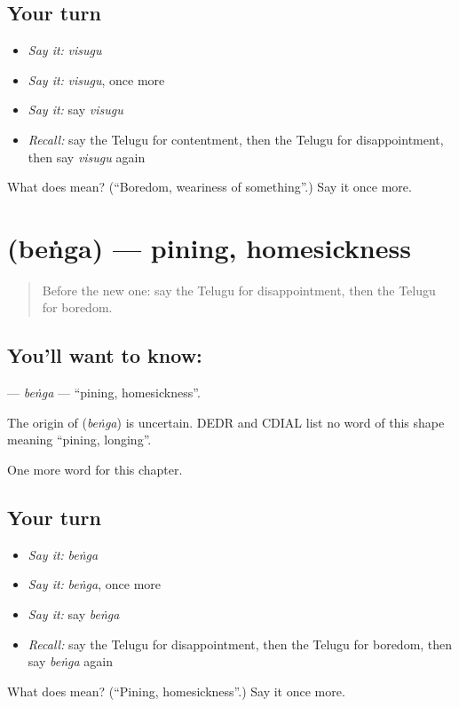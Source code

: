 \subsection*{Your turn}
\begin{itemize}
\raggedright
  \item \emph{Say it:} \emph{visugu}
  \item \emph{Say it:} \emph{visugu}, once more
  \item \emph{Say it:} say \emph{visugu}
  \item \emph{Recall:} say the Telugu for contentment, then the Telugu for disappointment, then say \emph{visugu} again
\end{itemize}

\begin{tcolorbox}[breakable,colback=teal!4,colframe=teal!35!black,title={Before you move on}]
What does  mean? (\textquotedblleft{}Boredom, weariness of something\textquotedblright{}.) Say it once more.
\end{tcolorbox}
\section[\texorpdfstring{\te{బెంగ} (beṅga)}{బెంగ (beṅga)}]{ (beṅga) — pining, homesickness}

\label{lesson:TE-C210-benga}



\begin{quote}
Before the new one: say the Telugu for disappointment, then the Telugu for boredom.
\end{quote}

\subsection*{You'll want to know: }
\textbf{} — \emph{beṅga} — \textquotedblleft{}pining, homesickness\textquotedblright{}.

\begin{cousinweb}
The origin of \textbf{} (\emph{beṅga}) is uncertain. DEDR and CDIAL list no word of this shape meaning \textquotedblleft{}pining, longing\textquotedblright{}.
\end{cousinweb}

\begin{grammarlens}[title={What you've built}]
One more word for this chapter.
\end{grammarlens}

\subsection*{Your turn}
\begin{itemize}
\raggedright
  \item \emph{Say it:} \emph{beṅga}
  \item \emph{Say it:} \emph{beṅga}, once more
  \item \emph{Say it:} say \emph{beṅga}
  \item \emph{Recall:} say the Telugu for disappointment, then the Telugu for boredom, then say \emph{beṅga} again
\end{itemize}

\begin{tcolorbox}[breakable,colback=teal!4,colframe=teal!35!black,title={Before you move on}]
What does  mean? (\textquotedblleft{}Pining, homesickness\textquotedblright{}.) Say it once more.
\end{tcolorbox}
